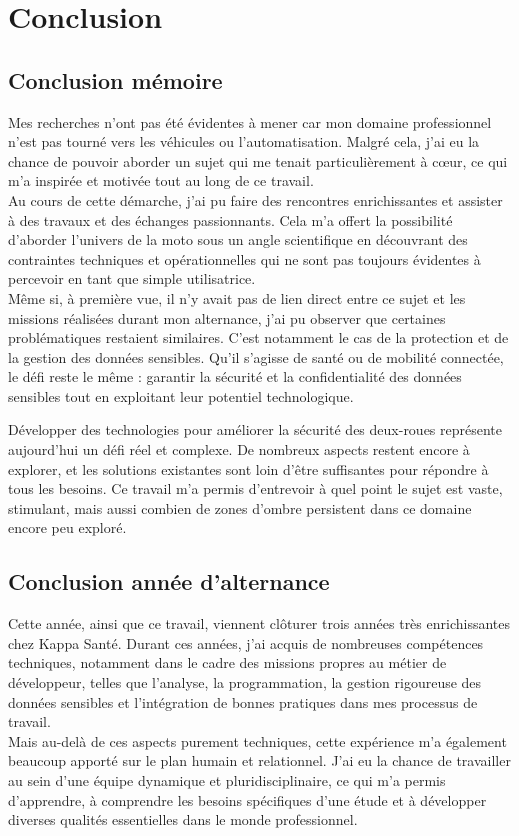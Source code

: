 \section{Conclusion}


\subsection{Conclusion mémoire}
Mes recherches n’ont pas été évidentes à mener car mon domaine professionnel  n’est pas tourné vers les véhicules ou l’automatisation. Malgré cela, j’ai eu la chance de pouvoir aborder un sujet qui me tenait particulièrement à cœur, ce qui m'a inspirée et motivée tout au long de ce travail.\\
Au cours de cette démarche, j’ai pu faire des rencontres enrichissantes et assister à des travaux et des échanges passionnants. Cela m’a offert la possibilité d’aborder l’univers de la moto sous un angle scientifique en découvrant des contraintes techniques et opérationnelles qui ne sont pas toujours évidentes à percevoir en tant que simple utilisatrice.\\
Même si, à première vue, il n’y avait pas de lien direct entre ce sujet et les missions réalisées durant mon alternance, j’ai pu observer que certaines problématiques restaient similaires. C’est notamment le cas de la protection et de la gestion des données sensibles. Qu’il s’agisse de santé ou de mobilité connectée, le défi reste le même : garantir la sécurité et la confidentialité des données sensibles tout en exploitant leur potentiel technologique.
\vspace{0.5cm}

Développer des technologies pour améliorer la sécurité des deux-roues représente aujourd’hui un défi réel et complexe. De nombreux aspects restent encore à explorer, et les solutions existantes sont loin d’être suffisantes pour répondre à tous les besoins. Ce travail m’a permis d'entrevoir à quel point le sujet est vaste, stimulant, mais aussi combien de zones d’ombre persistent dans ce domaine encore peu exploré.


\subsection{Conclusion année d'alternance}
Cette année, ainsi que ce travail, viennent clôturer trois années très enrichissantes chez Kappa Santé. Durant ces années, j'ai acquis de nombreuses compétences techniques, notamment dans le cadre des missions propres au métier de développeur, telles que l'analyse, la programmation, la gestion rigoureuse des données sensibles et l’intégration de bonnes pratiques dans mes processus de travail.\\
Mais au-delà de ces aspects purement techniques, cette expérience m'a également beaucoup apporté sur le plan humain et relationnel. J'ai eu la chance de travailler au sein d'une équipe dynamique et pluridisciplinaire, ce qui m’a permis d’apprendre, à comprendre les besoins spécifiques d'une étude et à développer diverses qualités essentielles dans le monde professionnel.
\vspace{0.5cm}

